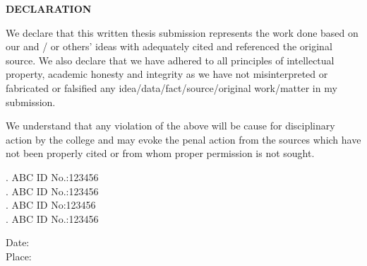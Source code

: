 
\begin{center}
	\vspace*{2cm}
	\textbf{\Large DECLARATION} \\[2em]
\end{center}

We declare that this written thesis submission represents the work done based on our and / or others’ ideas with adequately cited and referenced the original source. We also declare that we have adhered to all principles of intellectual property, academic honesty and integrity as we have not misinterpreted or fabricated or falsified any idea/data/fact/source/original work/matter in my submission.

We understand that any violation of the above will be cause for disciplinary action by the college and may evoke the penal action from the sources which have not been properly
cited or from whom proper permission is not sought. \\


\vspace{8em}
\begin{flushright}
	.  ABC ID No.:123456 \\[2em]
	.  ABC ID No.:123456 \\[2em]
	.  ABC ID No:123456 \\[2em]
	.  ABC ID No.:123456\\[2em]
\end{flushright}
\vspace{4em}
Date: 
\vspace{2em} \\
Place: